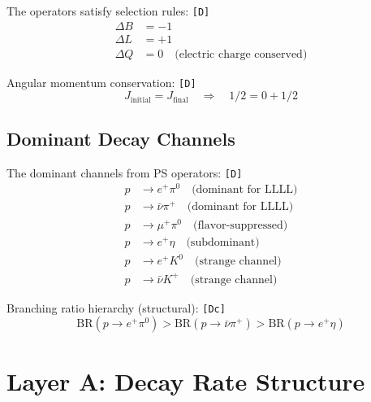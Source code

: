 \documentclass[11pt,a4paper]{article}
\newcommand{\tagD}{\textcolor{green!50!black}{\texttt{[D]}}}
\newcommand{\tagDc}{\textcolor{blue!70!black}{\texttt{[Dc]}}}
\theoremstyle{definition}
\begin{document}
The operators satisfy selection rules: \tagD{}
\begin{align}
\label{eq:sel-deltaB}
\Delta B &= -1 \\
\label{eq:sel-deltaL}
\Delta L &= +1 \\
\label{eq:sel-deltaQ}
\Delta Q &= 0 \quad \text{(electric charge conserved)}
\end{align}

Angular momentum conservation: \tagD{}
\begin{equation}
\label{eq:angular-momentum}
J_{\text{initial}} = J_{\text{final}} \quad \Rightarrow \quad 1/2 = 0 + 1/2
\end{equation}

\subsection{Dominant Decay Channels}
\label{subsec:dominant-channels}

The dominant channels from PS operators: \tagD{}
\begin{align}
\label{eq:channel-epi0}
p &\to e^+ \pi^0 \quad \text{(dominant for LLLL)} \\
\label{eq:channel-nupi}
p &\to \bar{\nu} \pi^+ \quad \text{(dominant for LLLL)} \\
\label{eq:channel-mupi0}
p &\to \mu^+ \pi^0 \quad \text{(flavor-suppressed)} \\
\label{eq:channel-eeta}
p &\to e^+ \eta \quad \text{(subdominant)} \\
\label{eq:channel-eK0}
p &\to e^+ K^0 \quad \text{(strange channel)} \\
\label{eq:channel-nuK}
p &\to \bar{\nu} K^+ \quad \text{(strange channel)}
\end{align}

Branching ratio hierarchy (structural): \tagDc{}
\begin{equation}
\label{eq:branching-hierarchy}
\text{BR}(p \to e^+ \pi^0) > \text{BR}(p \to \bar{\nu} \pi^+) > \text{BR}(p \to e^+ \eta)
\end{equation}

\section{Layer A: Decay Rate Structure}
\label{sec:decay-rate}
\end{document}
